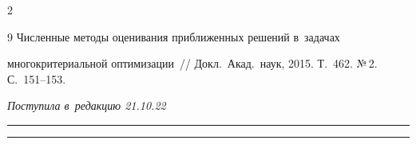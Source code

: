 \begin{multicols}{2}
{{\begin{thebibliography}{9}
 Численные методы оценивания приближенных решений в~задачах 


многокритериальной оптимизации~// Докл.\ Акад.\ наук, 2015. Т.~462. №\,2. С.~151--153.





\end{thebibliography}





 }


 }





\end{multicols}





\vspace*{-10pt}





\hfill{\small\textit{Поступила в~редакцию 21.10.22}}





\vspace*{6pt}




















\hrule





\vspace*{2pt}





\hrule











\def\tit{PROCEDURE OF~CONSTRUCTING A~PARETO SET 


FOR~DIFFERENTIABLE CRITERIA FUNCTIONS}








